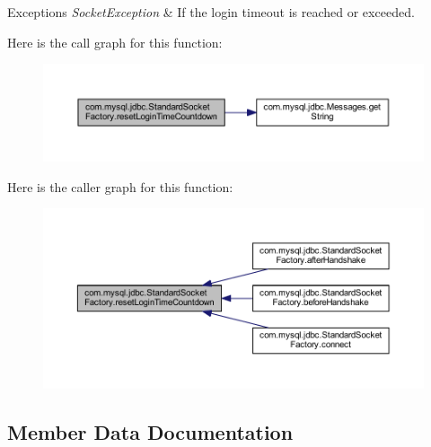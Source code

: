 \begin{DoxyExceptions}{Exceptions}
{\em Socket\+Exception} & If the login timeout is reached or exceeded. \\
\hline
\end{DoxyExceptions}
Here is the call graph for this function\+:
\nopagebreak
\begin{figure}[H]
\begin{center}
\leavevmode
\includegraphics[width=350pt]{classcom_1_1mysql_1_1jdbc_1_1_standard_socket_factory_ad78f473677314a3dc66e326b8dd3ba2a_cgraph}
\end{center}
\end{figure}
Here is the caller graph for this function\+:
\nopagebreak
\begin{figure}[H]
\begin{center}
\leavevmode
\includegraphics[width=350pt]{classcom_1_1mysql_1_1jdbc_1_1_standard_socket_factory_ad78f473677314a3dc66e326b8dd3ba2a_icgraph}
\end{center}
\end{figure}


\subsection{Member Data Documentation}
\mbox{\label{classcom_1_1mysql_1_1jdbc_1_1_standard_socket_factory_ab21c6df0f1198825c6576d08ceb6df8e}} 
